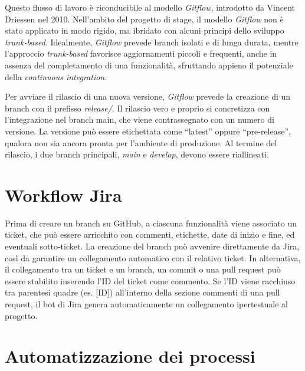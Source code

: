 \vspace{10pt}
\par\noindent Questo flusso di lavoro è riconducibile al modello \textit{Gitflow}, introdotto da Vincent Driessen nel 2010. Nell’ambito del progetto di stage, il modello \textit{Gitflow} non è stato applicato in modo rigido, ma ibridato con alcuni principi dello sviluppo \textit{trunk-based}. Idealmente, \textit{Gitflow} prevede branch isolati e di lunga durata, mentre l’approccio \textit{trunk-based} favorisce aggiornamenti piccoli e frequenti, anche in assenza del completamento di una funzionalità, sfruttando appieno il potenziale della \textit{continuous integration}.

\vspace{10pt}
\par\noindent Per avviare il rilascio di una nuova versione, \textit{Gitflow} prevede la creazione di un branch con il prefisso \textit{release/}. Il rilascio vero e proprio si concretizza con l’integrazione nel branch main, che viene contrassegnato con un numero di versione. La versione può essere etichettata come “latest” oppure “pre-release”, qualora non sia ancora pronta per l’ambiente di produzione. Al termine del rilascio, i due branch principali, \textit{main} e \textit{develop}, devono essere riallineati.

\section{Workflow Jira}

\par Prima di creare un branch su GitHub, a ciascuna funzionalità viene associato un ticket, che può essere arricchito con commenti, etichette, date di inizio e fine, ed eventuali sotto-ticket. La creazione del branch può avvenire direttamente da Jira, così da garantire un collegamento automatico con il relativo ticket. In alternativa, il collegamento tra un ticket e un branch, un commit o una pull request può essere stabilito inserendo l’ID del ticket come commento. Se l’ID viene racchiuso tra parentesi quadre (es. [ID]) all’interno della sezione commenti di una pull request, il bot di Jira genera automaticamente un collegamento ipertestuale al progetto.

\section{Automatizzazione dei processi}

